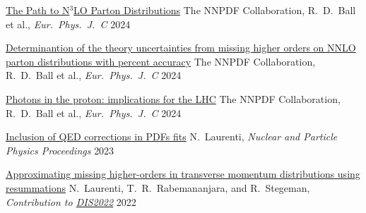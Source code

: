 
\begin{cvhonors}

    
    \cvhonor
    {\href{https://arxiv.org/pdf/2402.18635.pdf}{The Path to N$^3$LO Parton Distributions}} %
    {The NNPDF Collaboration, R.\ D.\ Ball et al., \emph{Eur.\ Phys.\ J.\ C}} %
    {}
    {2024}
    
    \cvhonor
    {\href{https://arxiv.org/pdf/2401.10319.pdf}{Determinantion of the theory uncertainties from missing higher orders on NNLO parton distributions with percent accuracy}} %
    {The NNPDF Collaboration, R.\ D.\ Ball et al., \emph{Eur.\ Phys.\ J.\ C}} %
    {}
    {\vspace{0.35cm}2024}
    
    \cvhonor
    {\href{https://arxiv.org/pdf/2401.08749.pdf}{Photons in the proton: implications for the LHC}} %
    {The NNPDF Collaboration, R.\ D.\ Ball et al., \emph{Eur.\ Phys.\ J.\ C}} %
    {}
    {2024}

    \cvhonor
    {\href{https://doi.org/10.1016/j.nuclphysbps.2023.11.013}{Inclusion of QED corrections in PDFs ﬁts}}
    {N.\ Laurenti, \textit{Nuclear and Particle Physics Proceedings}}
    {}
    {2023}
    
    \cvhonor
    {\href{https://arxiv.org/abs/2207.12265}{Approximating missing higher-orders in transverse momentum distributions using resummations}}
    {N.~Laurenti, T.\ R.\ Rabemananjara, and R.\ Stegeman, \emph{Contribution to \href{https://inspirehep.net/conferences/1914506?ui-citation-summary=true}{DIS2022}}}
    {}
    {\vspace{0.35cm}2022}

\end{cvhonors}